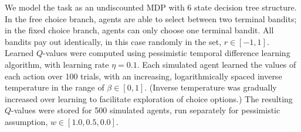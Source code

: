 \documentclass[11pt]{article} %
\begin{document}
We model the task as an undiscounted MDP with 6 state decision tree structure. In the free choice branch, agents are able to select between two terminal bandits; in the fixed choice branch, agents can only choose one terminal bandit. All bandits pay out identically, in this case randomly in the set, $r \in [-1, 1]$. Learned $Q$-values were computed using pessimistic temporal difference learning algorithm, with learning rate $\eta = 0.1$. Each simulated agent learned the values of each action over 100 trials, with an increasing, logarithmically spaced inverse temperature in the range of $\beta \in [0, 1]$. (Inverse temperature was gradually increased over learning to facilitate exploration of choice options.) The resulting $Q$-values were stored for 500 simulated agents, run separately for pessimistic assumption, $w \in [1.0, 0.5, 0.0]$. 


\small{}
\end{document}
